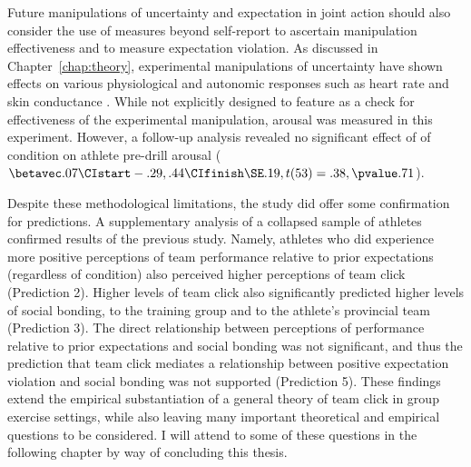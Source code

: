 \begin{CJK}{UTF8}{gbsn}

Future manipulations of uncertainty and expectation in joint action should also consider the use of measures beyond self-report to ascertain manipulation effectiveness and to measure expectation violation.  As discussed in Chapter~\ref{chap:theory}, experimental manipulations of uncertainty have shown effects on various physiological and autonomic responses such as heart rate \citep{Averill1972} and skin conductance \citep{Epstein1970}. While not explicitly designed to feature as a check for effectiveness of the experimental manipulation, arousal was measured in this experiment.  However,  a follow-up analysis revealed no significant effect of of condition on athlete pre-drill arousal  ($\betavec .07 \CIstart -.29, .44 \CIfinish \SE .19, t(53)= .38, \pvalue .71$).

Despite these methodological limitations, the study did offer some confirmation for predictions.  A supplementary analysis of a collapsed sample of athletes confirmed results of the previous study.  Namely, athletes who did experience more positive perceptions of team performance relative to prior expectations (regardless of condition) also perceived higher perceptions of team click (Prediction 2).  Higher levels of team click also significantly predicted higher levels of social bonding, to the training group and to the athlete's provincial team (Prediction 3).  The direct relationship between perceptions of performance relative to prior expectations and social bonding was not significant, and thus the prediction that team click mediates a relationship between positive expectation violation and social bonding was not supported (Prediction 5). These findings extend the empirical substantiation of a general theory of team click in group exercise settings, while also leaving many important theoretical and empirical questions to be considered.  I will attend to some of these questions in the following chapter by way of concluding this thesis.


                                                          \end{CJK}
